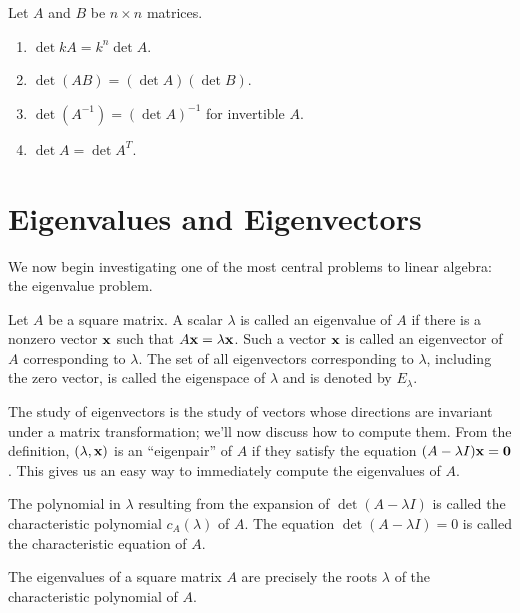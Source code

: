 \documentclass[../m073main.tex]{subfiles}
\begin{document}
\begin{theorem}
	Let $A$ and $B$ be $n \times n$ matrices.
	\begin{multicols}{2}
		\begin{enumerate}[label=(\alph*),topsep=0pt]
			\item $\det kA = k^{n} \det A$.
			\item $\det(AB) = (\det A) (\det B)$.
			\item $\det (A^{-1}) = (\det A)^{-1}$ for invertible $A$.
			\item $\det A = \det A^T$.
		\end{enumerate}
	\end{multicols}
\end{theorem}

\section{Eigenvalues and Eigenvectors}
We now begin investigating one of the most central problems to linear algebra: the eigenvalue problem.

\begin{definition}
	Let $A$ be a square matrix.
	A scalar $\lambda$ is called an eigenvalue of $A$ if there is a nonzero vector $\mathbf{x}$ such that $A \mathbf{x} = \lambda \mathbf{x}$.
	Such a vector $\mathbf{x}$ is called an eigenvector of $A$ corresponding to $\lambda$.
	The set of all eigenvectors corresponding to $\lambda$, including the zero vector, is called the eigenspace of $\lambda$ and is denoted by $E_\lambda$.
\end{definition}

The study of eigenvectors is the study of vectors whose directions are invariant under a matrix transformation; we'll now discuss how to compute them.
From the definition, $(\lambda, \mathbf{x})$ is an ``eigenpair'' of $A$ if they satisfy the equation $(A - \lambda I) \mathbf{x} = \mathbf{0}$.
This gives us an easy way to immediately compute the eigenvalues of $A$.

\begin{definition}
	The polynomial in $\lambda$ resulting from the expansion of $\det (A - \lambda I)$ is called the characteristic polynomial $c_A (\lambda)$ of $A$.
	The equation $\det (A - \lambda I) = 0$ is called the characteristic equation of $A$.
\end{definition}

\begin{theorem}
	The eigenvalues of a square matrix $A$ are precisely the roots $\lambda$ of the characteristic polynomial of $A$.
\end{theorem}
\end{document}
